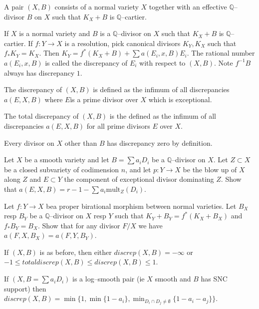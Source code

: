 \begin{definition}
    A pair \((X,B)\) consists of a normal variety \(X\) together with an
    effective \(\mathbb{Q}\)--divisor \(B\) on \(X\) such that \(K_X+B\) is
    \(\mathbb{Q}\)--cartier.
\end{definition}

\begin{definition}
    If \(X\) is a normal variety and \(B\) is a \(\mathbb{Q}\)--divisor on \(X\)
    such that \(K_X+B\) is \(\mathbb{Q}\)--cartier. If \(f:Y\to X\) is a
    resolution, pick canonical divisors \(K_Y,K_X\) such that \(f_\ast
    K_Y=K_X\). Then \(K_Y=f^\ast (K_X+B) + \sum a(E_i, x, B)E_i\). The rational
    number \(a(E_i,x,B)\) is called the discrepancy of \(E_i\) with respect to
    \((X,B)\). Note \(f^{-1}B\) always has discrepancy \(1\).
\end{definition}

The discrepancy of \((X,B)\) is defined as the infimum of all discrepancies
\(a(E,X,B)\) where \(E\)is a prime divisor over \(X\) which is exceptional.

The total discrepancy of \((X,B)\) is the defined as the infimum of all
discrepancies \(a(E,X,B)\) for all prime divisors \(E\) over \(X\).

Every divisor on \(X\) other than \(B\) has discrepancy zero by definition.

\begin{exercise}
    Let \(X\) be a smooth variety and let \(B=\sum a_iD_i\) be a
    \(\mathbb{Q}\)--divisor on \(X\). Let \(Z\subset X\) be a closed subvariety
    of codimension \(n\), and let \(p:Y\to X\) be the blow up of \(X\) along
    \(Z\) and \(E\subset Y\) the component of exceptional divisor dominating
    \(Z\). Show that \(a(E,X,B)=r-1-\sum a_i\text{mult}_Z(D_i)\).
\end{exercise}

\begin{exercise}
    Let \(f:Y\to X\) bea  proper birational morphism between normal varieties.
    Let \(B_X\) resp \(B_Y\) be a \(\mathbb{Q}\)--divisor on \(X\) resp \(Y\)
    such that \(K_Y+B_Y=f^\ast (K_X+B_X)\) and \(f_\ast B_Y=B_X\). Show that for
    any divisor \(F/X\) we have \(a(F,X,B_X)=a(F,Y,B_Y)\).
\end{exercise}

\begin{lemma}
    If \((X,B)\) is as before, then either \(discrep(X,B)=-\infty\) or
    \(-1\leq totaldiscrep(X,B)\leq discrep(X,B) \leq 1\).

    If \((X,B=\sum a_i D_i)\) is a log--smooth pair (ie \(X\) smooth and \(B\)
    has SNC support) then \(discrep(X,B)=\min\{1,\min\{1-a_i\},\min_{D_i\cap
    D_j\neq \emptyset}\{1-a_i-a_j\}\}.\)
\end{lemma}

